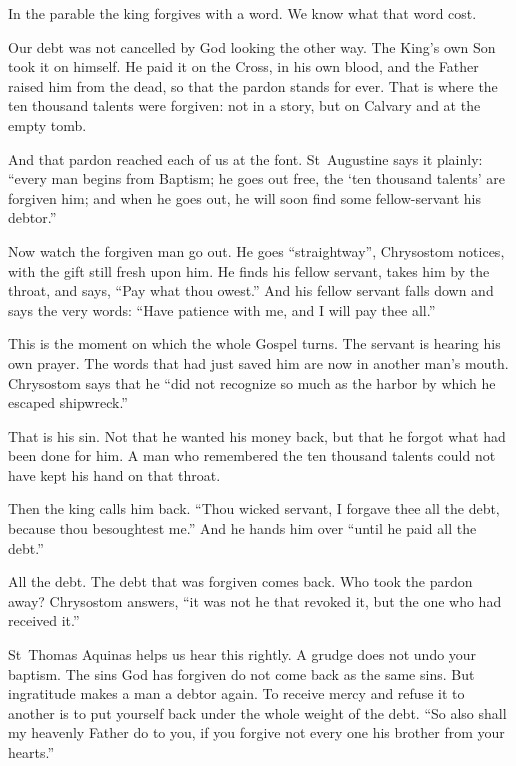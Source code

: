 \medskip

In the parable the king forgives with a word. We know what that word cost.

Our debt was not cancelled by God looking the other way. The King's own Son
took it on himself. He paid it on the Cross, in his own blood, and the Father
raised him from the dead, so that the pardon stands for ever. That is where
the ten thousand talents were forgiven: not in a story, but on Calvary and at
the empty tomb.

And that pardon reached each of us at the font. St~Augustine says it plainly:
``every man begins from Baptism; he goes out free, the `ten thousand talents'
are forgiven him; and when he goes out, he will soon find some fellow-servant
his debtor.''

\medskip

Now watch the forgiven man go out. He goes ``straightway'', Chrysostom notices, with the gift still fresh upon
him. He finds his fellow servant, takes him by the throat, and says, ``Pay what
thou owest.'' And his fellow servant falls down and says the very words: ``Have
patience with me, and I will pay thee all.''

This is the moment on which the whole Gospel turns. The servant is hearing his
own prayer. The words that had just saved him are now in another man's mouth.
Chrysostom says that he ``did not recognize so much as the harbor by which he
escaped shipwreck.''

That is his sin. Not that he wanted his money back, but that he forgot what
had been done for him. A man who remembered the ten thousand talents could not
have kept his hand on that throat.

\medskip

Then the king calls him back. ``Thou wicked servant, I forgave thee all the
debt, because thou besoughtest me.'' And he hands him over ``until he paid all
the debt.''

All the debt. The debt that was forgiven comes back. Who took the pardon away?
Chrysostom answers, ``it was not he that revoked it, but the one who had
received it.''

St~Thomas Aquinas helps us hear this rightly. A grudge does not
undo your baptism. The sins God has forgiven do not come back as the same sins.
But ingratitude makes a man a debtor again. To receive mercy and refuse it to
another is to put yourself back under the whole weight of the debt. ``So also
shall my heavenly Father do to you, if you forgive not every one his brother
from your hearts.''

